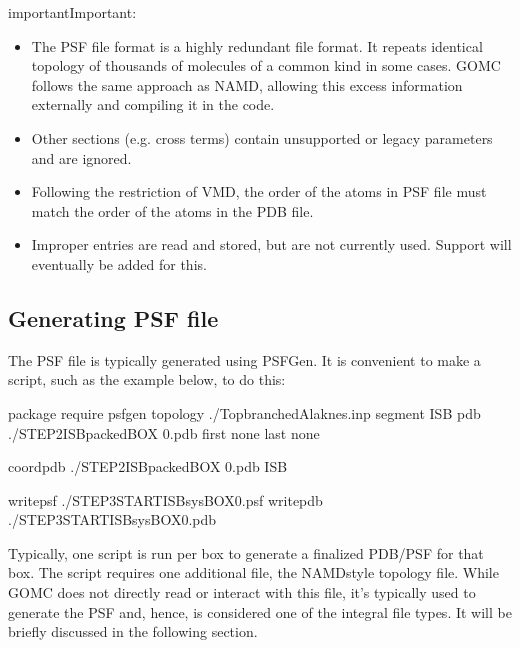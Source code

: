 \documentclass[letterpaper,10pt,english]{sphinxmanual}
\begin{document}
\begin{sphinxadmonition}{important}{Important:}\begin{itemize}
\item {} 
\sphinxAtStartPar
The PSF file format is a highly redundant file format. It repeats identical topology of thousands of molecules of a common kind in some cases. GOMC follows the same approach as NAMD, allowing this excess information externally and compiling it in the code.

\item {} 
\sphinxAtStartPar
Other sections (e.g. cross terms) contain unsupported or legacy parameters and are ignored.

\item {} 
\sphinxAtStartPar
Following the restriction of VMD, the order of the atoms in PSF file must match the order of the atoms in the PDB file.

\item {} 
\sphinxAtStartPar
Improper entries are read and stored, but are not currently used. Support will eventually be added for this.

\end{itemize}
\end{sphinxadmonition}


\subsection{Generating PSF file}
\label{\detokenize{input_file:generating-psf-file}}
\sphinxAtStartPar
The PSF file is typically generated using PSFGen. It is convenient to make a script, such as the example below, to do this:

\begin{sphinxVerbatim}[commandchars=\\\{\}]
package require psfgen
topology  ./Top\PYGZus{}branched\PYGZus{}Alaknes.inp
segment ISB \PYGZob{}
  pdb   ./STEP2\PYGZus{}ISB\PYGZus{}packed\PYGZus{}BOX 0.pdb
  first   none
  last  none
\PYGZcb{}

coordpdb ./STEP2\PYGZus{}ISB\PYGZus{}packed\PYGZus{}BOX 0.pdb ISB

writepsf ./STEP3\PYGZus{}START\PYGZus{}ISB\PYGZus{}sys\PYGZus{}BOX\PYGZus{}0.psf
writepdb ./STEP3\PYGZus{}START\PYGZus{}ISB\PYGZus{}sys\PYGZus{}BOX\PYGZus{}0.pdb
\end{sphinxVerbatim}

\sphinxAtStartPar
Typically, one script is run per box to generate a finalized PDB/PSF for that box. The script requires one additional file, the NAMD\sphinxhyphen{}style topology file. While GOMC does not directly read or interact with this file, it’s typically used to generate the PSF and, hence, is considered one of the integral file types. It will be briefly discussed in the following section.
\end{document}
